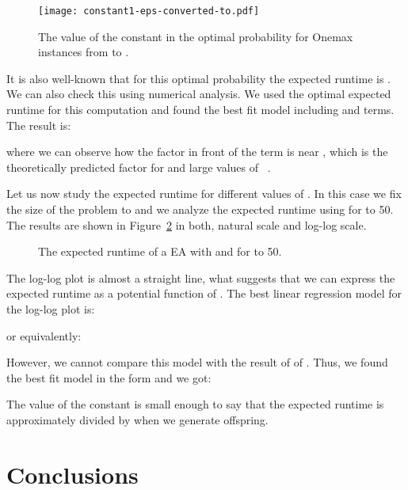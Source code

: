 \documentclass{article}
\begin{document}
\begin{figure}[!ht]
\centering
\texttt{[image: constant1-eps-converted-to.pdf]}
\caption{The value of the constant  in the optimal probability  for Onemax instances from  to .}
\label{fig:constant}
\end{figure}

It is also well-known that for this optimal probability the expected runtime is . We can also check this using numerical analysis. We used the optimal expected runtime for this computation and found the best fit model including  and  terms. The result is:

where we can observe how the factor in front of the  term is near , which is the theoretically predicted factor for  and large values of ~\citep{Witt2013tight}.


Let us now study the expected runtime for different values of . In this case we fix the size of the problem to  and we analyze the expected runtime using  for  to 50. The results are shown in Figure~\ref{fig:lambda} in both, natural scale and log-log scale.

\begin{figure}[!ht]
\centering
{}
\caption{The expected runtime of a  EA with  and  for  to 50.}
\label{fig:lambda}
\end{figure}

The log-log plot is almost a straight line, what suggests that we can express the expected runtime as a potential function of . The best linear regression model for the log-log plot is:

or equivalently:


However, we cannot compare this model with the result of \cite{Jansen2005} of . Thus, we found the best fit model in the form  and we got:


The value of the constant  is small enough to say that the expected runtime is approximately divided by  when we generate  offspring. 





\section{Conclusions}
\label{sec:conclusions}
\end{document}
